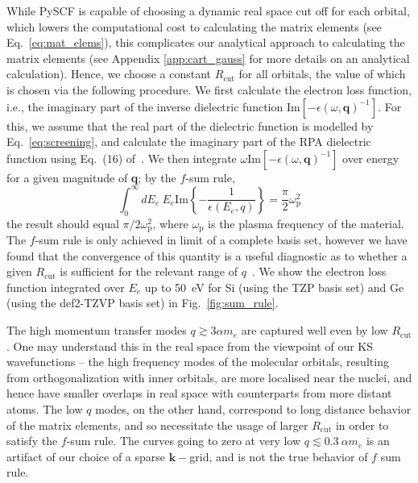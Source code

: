 \documentclass[
    prd, twocolumn, superscriptaddress, nofootinbib, amsmath, amssymb,
    aps, floatfix,preprintnumbers
]{revtex4-2}
\begin{document}
        While PySCF is capable of choosing a dynamic real space cut off for each orbital, which lowers the computational cost to calculating the matrix elements (see Eq.~\ref{eq:mat_elems}), this complicates our analytical approach to calculating the matrix elements (see Appendix \ref{app:cart_gauss} for more details on an analytical calculation). Hence, we choose a constant $R_\mathrm{cut}$ for all orbitals, the value of which is chosen via the following procedure. We first calculate the electron loss function, i.e., the imaginary part of the inverse dielectric function $\text{Im}\left[-\epsilon(\omega,\textbf{q})^{-1}\right]$. For this, we assume that the real part of the dielectric function is modelled by Eq.~\eqref{eq:screening}, and calculate the imaginary part of the RPA dielectric function using Eq.~(16) of~\cite{Knapen:2021run}. We then integrate $\omega\text{Im}\left[-\epsilon(\omega,\textbf{q})^{-1}\right]$ over energy for a given magnitude of \textbf{q}; by the $f$-sum rule,
        \begin{equation}
            \int_0^\infty dE_e\ E_e \mathrm{Im}\left\{-\frac{1}{\epsilon(E_e, q)}\right\} = \frac{\pi}{2}\omega_\mathrm{p}^2
        \end{equation}
        the result should equal $\pi/2\omega_\text{p}^2$, where $\omega_\text{p}$ is the plasma frequency of the material. The $f$-sum rule is only achieved in limit of a complete basis set, however we have found that the convergence of this quantity is a useful diagnostic as to whether a given $R_\mathrm{cut}$ is sufficient for the relevant range of $q$~\citep{Hochberg2021Diel}. We show the electron loss function integrated over $E_e$ up to 50~eV for Si (using the TZP basis set) and Ge (using the def2-TZVP basis set) in Fig.~\ref{fig:sum_rule}.
        
        The high momentum transfer modes $q\gtrsim3\alpha m_e$ are captured well even by low $R_\mathrm{cut}$. One may understand this in the real space from the viewpoint of our KS wavefunctions -- the high frequency modes of the molecular orbitals, resulting from orthogonalization with inner orbitals, are more localised near the nuclei, and hence have smaller overlaps in real space with counterparts from more distant atoms. The low $q$ modes, on the other hand, correspond to long distance behavior of the matrix elements, and so necessitate the usage of larger $R_\mathrm{cut}$ in order to satisfy the $f$-sum rule. The curves going to zero at very low $q\lesssim0.3\ \alpha m_e$ is an artifact of our choice of a sparse $\mathbf{k}-$grid, and is not the true behavior of $f$ sum rule. 
        
\end{document}
